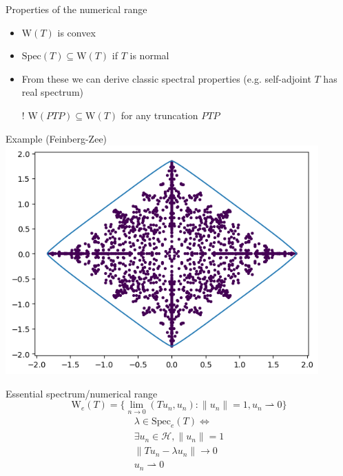 \documentclass[14pt]{beamer}
\newcommand{\Spec}{\mathrm{Spec}} %
\newcommand{\Num}{\mathrm{W}} %
\begin{document}
\begin{frame}{Properties of the numerical range}
  \begin{itemize}
    \item $\Num(T)$ is convex 
    \item $\Spec(T) \subseteq \Num(T)$ if $T$ is normal
    \item From these we can derive classic spectral properties (e.g. self-adjoint $T$ has real spectrum)
    \item[!] $\Num(PTP) \subseteq \Num(T)$ for any truncation $PTP$
  \end{itemize}
\end{frame}

\begin{frame}{Example (Feinberg-Zee)}
  \includegraphics[width=0.9\textwidth]{feinberg-zee-num-range}
\end{frame}

\begin{frame}{Essential spectrum/numerical range}
  \centering
  $$\Num_e(T) = \{\lim_{n \rightarrow 0}(Tu_n, u_n) : \|u_n\| = 1, u_n \rightharpoonup 0\}$$
  \begin{align*}
    \lambda \in \Spec_e(T) \Leftrightarrow \\
    \exists u_n \in \mathcal{H}, \|u_n\|=1 \\
    \|Tu_n - \lambda u_n\| \rightarrow 0 \\
    u_n \rightharpoonup 0
  \end{align*}
\end{frame}
\end{document}
